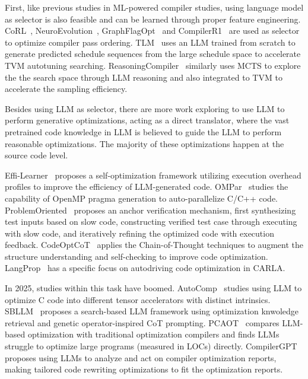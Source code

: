\documentclass[pdflatex,sn-mathphys-ay,twocolumn, a4paper]{sn-jnl}%
\theoremstyle{thmstyleone}%
\theoremstyle{thmstyletwo}%
\theoremstyle{thmstylethree}%
\begin{document}
First, like previous studies in ML-powered compiler studies, using language model as selector is also feasible and can be learned through proper feature engineering. CoRL~\citep{40_mammadli2020static_llvmhpc}, NeuroEvolution~\citep{127_neuroevolutionary2023_gecco}, GraphFlagOpt~\citep{125_graphbased2024_hpec} and CompilerR1~\citep{45_compilerr1-2025_arxiv} are used as selector to optimize compiler pass ordering. TLM~\citep{167_zhai2024_osdi} uses an LLM trained from scratch to generate predicted schedule sequences from the large schedule space to accelerate TVM autotuning searching. ReasoningCompiler~\citep{4_tang2025compiler_arxiv} similarly uses MCTS to explore the the search space through LLM reasoning and also integrated to TVM to accelerate the sampling efficiency.

Besides using LLM as selector, there are more work exploring to use LLM to perform generative optimizations, acting as a direct translator, where the vast pretrained code knowledge in LLM is believed to guide the LLM to perform reasonable optimizations. The majority of these optimizations happen at the source code level. 

Effi-Learner~\citep{79_huang2024effilearner} proposes a self-optimization framework utilizing execution overhead profiles to improve the efficiency of LLM-generated code.
OMPar~\citep{93_kadosh2024omparautomaticparallelizationaidriven} studies the capability of OpenMP pragma generation to auto-parallelize C/C++ code.
ProblemOriented~\citep{123_ye2024problem} proposes an anchor verification mechanism, first synthesizing test inputs based on slow code, constructing verified test case through executing with slow code, and iteratively refining the optimized code with execution feedback.
CodeOptCoT~\citep{116_xu2024code} applies the Chain-of-Thought techniques to augment the structure understanding and self-checking to improve code optimization.
LangProp~\citep{30_ishida2024langprop} has a specific focus on autodriving code optimization in CARLA.

In 2025, studies within this task have boomed. AutoComp~\citep{6_hong2025autocomp} studies using LLM to optimize C code into different tensor accelerators with distinct intrinsics. 
SBLLM~\citep{17_gao2025search} proposes a search-based LLM framework using optimization knwoledge retrieval and genetic operator-inspired CoT prompting.
PCAOT~\citep{22_romero2025should} compares LLM-based optimization with traditional optimization compilers and finds LLMs struggle to optimize large programs (measured in LOCs) directly.
CompilerGPT~\citep{3_compilergpt2025_arxiv} proposes using LLMs to analyze and act on compiler optimization reports, making tailored code rewriting optimizations to fit the optimization reports.
\end{document}
